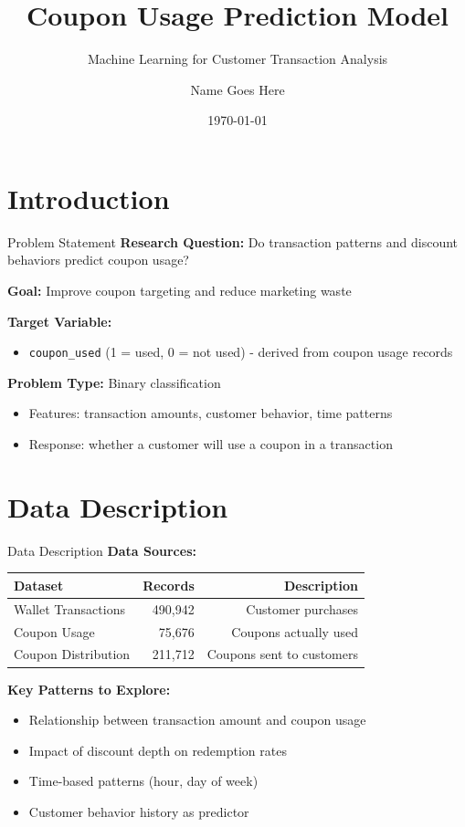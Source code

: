 \documentclass[aspectratio=169]{beamer}
\title{Coupon Usage Prediction Model}
\subtitle{Machine Learning for Customer Transaction Analysis}
\author{Name Goes Here}
\institute{University Goes Here}
\date{\today}
\begin{document}
\section{Introduction}

\frame{\titlepage}

\begin{frame}{Problem Statement}
\textbf{Research Question:} Do transaction patterns and discount behaviors predict coupon usage?

\textbf{Goal:} Improve coupon targeting and reduce marketing waste

\textbf{Target Variable:} 
\begin{itemize}
    \item \texttt{coupon\_used} (1 = used, 0 = not used) - derived from coupon usage records
\end{itemize}

\textbf{Problem Type:} Binary classification
\begin{itemize}
    \item Features: transaction amounts, customer behavior, time patterns
    \item Response: whether a customer will use a coupon in a transaction
\end{itemize}
\end{frame}

\section{Data Description}

\begin{frame}{Data Description}
\textbf{Data Sources:}
\begin{table}
\centering
\begin{tabular}{lrr}
\toprule
Dataset & Records & Description \\
\midrule
Wallet Transactions & 490,942 & Customer purchases \\
Coupon Usage & 75,676 & Coupons actually used \\
Coupon Distribution & 211,712 & Coupons sent to customers \\
\bottomrule
\end{tabular}
\end{table}

\textbf{Key Patterns to Explore:}
\begin{itemize}
    \item Relationship between transaction amount and coupon usage
    \item Impact of discount depth on redemption rates
    \item Time-based patterns (hour, day of week)
    \item Customer behavior history as predictor
\end{itemize}
\end{frame}
\end{document}
